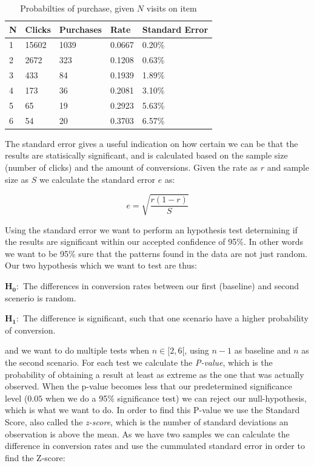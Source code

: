 \begin{table}[H]
  \centering
  \begin{tabular}{lllll}
    \toprule
    N & Clicks & Purchases & Rate & Standard Error \\
    \midrule
    1 & 15602 & 1039  & 0.0667 & 0.20\% \\
    2 & 2672  & 323   & 0.1208 & 0.63\% \\
    3 & 433   & 84    & 0.1939 & 1.89\% \\
    4 & 173   & 36    & 0.2081 & 3.10\% \\
    5 & 65    & 19    & 0.2923 & 5.63\% \\
    6 & 54    & 20    & 0.3703 & 6.57\% \\
    \bottomrule
  \end{tabular}
  \label{tab:prob-purchase}
  \caption{Probabilties of purchase, given $N$ visits on item}
\end{table}

The standard error gives a useful indication on how certain we can be that the
results are statisically significant, and is calculated based on the sample
size (number of clicks) and the amount of conversions. Given the rate as $r$
and sample size as $S$ we calculate the standard error $e$ as:

\begin{equation}
  e = \sqrt{\frac{r(1 - r)}{S}}
\end{equation}

Using the standard error we want to perform an hypothesis test determining if
the results are significant within our accepted confidence of 95\%. In other
words we want to be 95\% sure that the patterns found in the data are not just
random. Our two hypothesis which we want to test are thus:

$\mathbf{H_0:}$ The differences in conversion rates between our first
(baseline) and second scenerio is random.

$\mathbf{H_1:}$ The difference is significant, such that one scenario have a
higher probability of conversion.

and we want to do multiple tests when $n \in [2,6[$, using $n-1$ as baseline
and $n$ as the second scenario. For each test we calculate the
\textit{P-value}, which is the probability of obtaining a result at least as
extreme as the one that was actually observed. When the p-value becomes less
that our predetermined significance level ($0.05$ when we do a 95\%
significance test) we can reject our null-hypothesis, which is what we want to
do. In order to find this P-value we use the Standard Score, also called the
\textit{z-score}, which is the number of standard deviations an observation is
above the mean. As we have two samples we can calculate the difference in
conversion rates and use the cummulated standard error in order to find the
Z-score:

